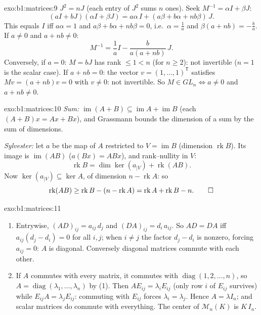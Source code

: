 \begin{solution}{exo:b1:matrices:9}
$J^2 = nJ$ (each entry of $J^2$ sums $n$ ones). Seek $M^{-1} =
\alpha I + \beta J$:
\[
(aI + bJ)(\alpha I + \beta J)
= a\alpha\, I + (a\beta + b\alpha + nb\beta)\, J .
\]
This equals $I$ iff $a\alpha = 1$ and $a\beta + b\alpha + nb\beta =
0$, i.e.\ $\alpha = \frac1a$ and $\beta(a + nb) = -\frac ba$. If $a
\neq 0$ and $a + nb \neq 0$:
\[
M^{-1} = \frac 1a I - \frac{b}{a(a + nb)}\, J .
\]
Conversely, if $a = 0$: $M = bJ$ has rank $\leq 1 < n$ (for $n \geq
2$): not invertible ($n = 1$ is the scalar case). If $a + nb = 0$:
the vector $v = (1, \dots, 1)^{\mathsf T}$ satisfies $Mv = (a +
nb)v = 0$ with $v \neq 0$: not invertible. So $M \in GL_n \iff a
\neq 0$ and $a + nb \neq 0$.
\end{solution}

\begin{solution}{exo:b1:matrices:10}
\emph{Sum:} $\operatorname{im}(A + B) \subseteq \operatorname{im} A
+ \operatorname{im} B$ (each $(A+B)x = Ax + Bx$), and Grassmann
bounds the dimension of a sum by the sum of dimensions.

\emph{Sylvester:} let $a$ be the map of $A$ restricted to $V =
\operatorname{im} B$ (dimension $\operatorname{rk} B$). Its image is
$\operatorname{im}(AB)$ ($a(Bx) = ABx$), and rank--nullity in $V$:
\[
\operatorname{rk} B = \dim\ker(a_{|V}) + \operatorname{rk}(AB) .
\]
Now $\ker(a_{|V}) \subseteq \ker A$, of dimension $n -
\operatorname{rk} A$: so
\[
\operatorname{rk}(AB) \geq \operatorname{rk} B - (n -
\operatorname{rk} A) = \operatorname{rk} A + \operatorname{rk} B -
n . \qedhere
\]
\end{solution}

\begin{solution}{exo:b1:matrices:11}
\begin{enumerate}
  \item Entrywise, $(AD)_{ij} = a_{ij}\,d_j$ and $(DA)_{ij} =
        d_i\,a_{ij}$. So $AD = DA$ iff $a_{ij}(d_j - d_i) = 0$
        for all $i, j$; when $i \neq j$ the factor $d_j - d_i$ is
        nonzero, forcing $a_{ij} = 0$: $A$ is diagonal.
        Conversely diagonal matrices commute with each other.
  \item If $A$ commutes with every matrix, it commutes with
        $\operatorname{diag}(1, 2, \dots, n)$, so $A =
        \operatorname{diag}(\lambda_1, \dots, \lambda_n)$ by (1).
        Then $A E_{ij} = \lambda_i E_{ij}$ (only row $i$ of
        $E_{ij}$ survives) while $E_{ij} A = \lambda_j E_{ij}$:
        commuting with $E_{ij}$ forces $\lambda_i = \lambda_j$.
        Hence $A = \lambda I_n$; and scalar matrices do commute
        with everything. The center of $\mathcal{M}_n(K)$ is
        $K\,I_n$.
\end{enumerate}
\end{solution}

